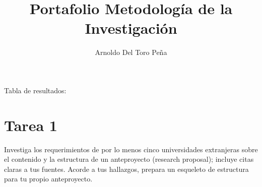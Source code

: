 \documentclass[12pt,letterpaper]{article}
\title{Portafolio Metodología de la Investigación}
\author{Arnoldo Del Toro Peña}
\begin{document}
	\maketitle
	Tabla de resultados:
	\begin{table}[h!]
	\end{table}
\section*{Tarea 1}
Investiga los requerimientos de por lo menos cinco universidades extranjeras sobre el contenido y la estructura de un anteproyecto (research proposal); incluye citas claras a tus fuentes. Acorde a tus hallazgos, prepara un esqueleto de estructura para tu propio anteproyecto.

\end{document}

